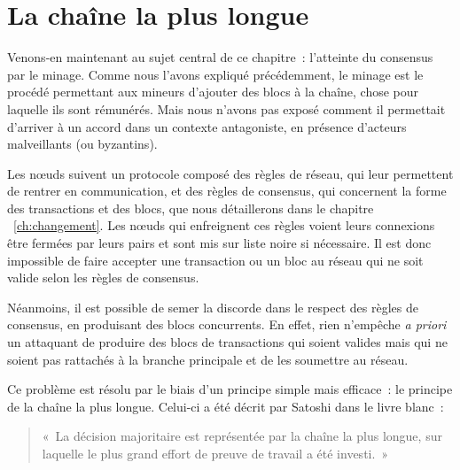 \section*{La chaîne la plus longue}

Venons-en maintenant au sujet central de ce chapitre~: l'atteinte du consensus par le minage. Comme nous l'avons expliqué précédemment, le minage est le procédé permettant aux mineurs d'ajouter des blocs à la chaîne, chose pour laquelle ils sont rémunérés. Mais nous n'avons pas exposé comment il permettait d'arriver à un accord dans un contexte antagoniste, en présence d'acteurs malveillants (ou byzantins).

Les nœuds suivent un protocole composé des règles de réseau, qui leur permettent de rentrer en communication, et des règles de consensus, qui concernent la forme des transactions et des blocs, que nous détaillerons dans le chapitre ~\ref{ch:changement}. Les nœuds qui enfreignent ces règles voient leurs connexions être fermées par leurs pairs et sont mis sur liste noire si nécessaire. Il est donc impossible de faire accepter une transaction ou un bloc au réseau qui ne soit valide selon les règles de consensus.

Néanmoins, il est possible de semer la discorde dans le respect des règles de consensus, en produisant des blocs concurrents. En effet, rien n'empêche \emph{a priori} un attaquant de produire des blocs de transactions qui soient valides mais qui ne soient pas rattachés à la branche principale et de les soumettre au réseau.


Ce problème est résolu par le biais d'un principe simple mais efficace~: le principe de la chaîne la plus longue. Celui-ci a été décrit par Satoshi dans le livre blanc~: 

\begin{quote}
«~La décision majoritaire est représentée par la chaîne la plus longue, sur laquelle le plus grand effort de preuve de travail a été investi.~»
\end{quote}

